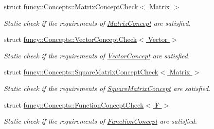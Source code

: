 \begin{DoxyCompactItemize}
struct \hyperlink{structfuncy_1_1Concepts_1_1MatrixConceptCheck}{funcy\-::\-Concepts\-::\-Matrix\-Concept\-Check$<$ Matrix $>$}
\begin{DoxyCompactList}\small\item\em Static check if the requirements of \hyperlink{structfuncy_1_1Concepts_1_1MatrixConcept}{Matrix\-Concept} are satisfied. \end{DoxyCompactList}\item 
struct \hyperlink{structfuncy_1_1Concepts_1_1VectorConceptCheck}{funcy\-::\-Concepts\-::\-Vector\-Concept\-Check$<$ Vector $>$}
\begin{DoxyCompactList}\small\item\em Static check if the requirements of \hyperlink{structfuncy_1_1Concepts_1_1VectorConcept}{Vector\-Concept} are satisfied. \end{DoxyCompactList}\item 
struct \hyperlink{structfuncy_1_1Concepts_1_1SquareMatrixConceptCheck}{funcy\-::\-Concepts\-::\-Square\-Matrix\-Concept\-Check$<$ Matrix $>$}
\begin{DoxyCompactList}\small\item\em Static check if the requirements of \hyperlink{structfuncy_1_1Concepts_1_1SquareMatrixConcept}{Square\-Matrix\-Concept} are satisfied. \end{DoxyCompactList}\item 
struct \hyperlink{structfuncy_1_1Concepts_1_1FunctionConceptCheck}{funcy\-::\-Concepts\-::\-Function\-Concept\-Check$<$ F $>$}
\begin{DoxyCompactList}\small\item\em Static check if the requirements of \hyperlink{structfuncy_1_1Concepts_1_1FunctionConcept}{Function\-Concept} are satisfied. \end{DoxyCompactList}\end{DoxyCompactItemize}
